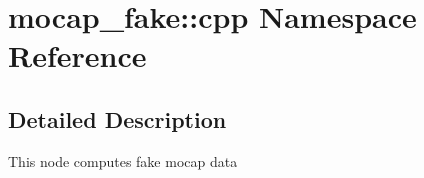 \hypertarget{namespacemocap__fake_1_1cpp}{}\section{mocap\+\_\+fake\+:\+:cpp Namespace Reference}
\label{namespacemocap__fake_1_1cpp}


\subsection{Detailed Description}
This node computes fake mocap data 